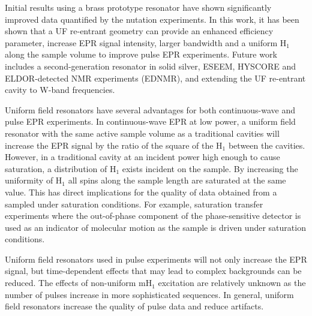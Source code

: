 Initial results using a brass prototype resonator have shown significantly improved data quantified by the nutation experiments. In this work, it has been shown that a UF re-entrant geometry can provide an enhanced efficiency parameter, increase EPR signal intensity, larger bandwidth and a uniform H$_1$ along the sample volume to improve pulse EPR experiments. Future work includes a second-generation resonator in solid silver, ESEEM, HYSCORE and ELDOR-detected NMR experiments (EDNMR), and extending the UF re-entrant \cylTE{} cavity to W-band frequencies.

Uniform field resonators have several advantages for both continuous-wave and pulse EPR experiments. In continuous-wave EPR at low power, a uniform field resonator with the same active sample volume as a traditional cavities will increase the EPR signal by the ratio of the square of the H$_1$ between the cavities. However, in a traditional cavity at an incident power high enough to cause saturation, a distribution of H$_1$ exists incident on the sample. By increasing the uniformity of H$_1$ all spins along the sample length are saturated at the same value. This has direct implications for the quality of data obtained from a sampled under saturation conditions. For example, saturation transfer experiments where the out-of-phase component of the phase-sensitive detector is used as an indicator of molecular motion as the sample is driven under saturation conditions. \cite{SaturationTransfer2005} 

Uniform field resonators used in pulse experiments will not only increase the EPR signal, but time-dependent effects that may lead to complex backgrounds can be reduced. The effects of non-uniform mH$_1$ excitation are relatively unknown as the number of pulses increase in more sophisticated sequences. In general, uniform field resonators increase the quality of pulse data and reduce artifacts.


{\renewcommand{\bibsection}{\clearpage\section*{\bibname}\markboth{\bibname}{\bibname}}
\renewcommand{\bibname}{CHAPTER 3. REFERENCES}

}